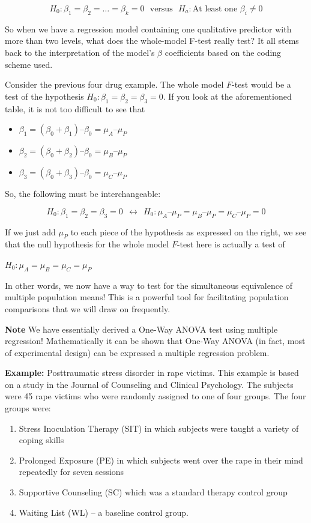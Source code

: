 \documentclass[
]{book}
\providecommand{\tightlist}{%
  \setlength{\itemsep}{0pt}\setlength{\parskip}{0pt}}
\begin{document}
\[H_0: \beta_1 = \beta_2 = \ldots = \beta_k = 0 ~~~\textrm{versus}~~~ H_a: \textrm{At least one } \beta_i \neq 0\]

So when we have a regression model containing one qualitative predictor with more than two levels, what does the whole-model F-test really test? It all stems back to the interpretation of the model's \(\beta\) coefficients based on the coding scheme used.

Consider the previous four drug example. The whole model \(F\)-test would be a test of the hypothesis \(H_0: \beta_1 = \beta_2 = \beta_3 = 0\). If you look at the aforementioned table, it is not too difficult to see that

\begin{itemize}
\tightlist
\item
  \(\beta_1 = (\beta_0 + \beta_1) – \beta_0 = \mu_A – \mu_P\)
\item
  \(\beta_2 = (\beta_0 + \beta_2) – \beta_0 = \mu_B – \mu_P\)
\item
  \(\beta_3 = (\beta_0 + \beta_3) – \beta_0 = \mu_C – \mu_P\)
\end{itemize}

So, the following must be interchangeable:

\[H_0: \beta_1 = \beta_2 = \beta_3 = 0 ~~\longleftrightarrow~~ H_0: \mu_A – \mu_P = \mu_B – \mu_P = \mu_C – \mu_P = 0\]

If we just add \(\mu_P\) to each piece of the hypothesis as expressed on the right, we see that the null hypothesis for the whole model \(F\)-test here is actually a test of

\(H_0: \mu_A = \mu_B = \mu_C = \mu_P\)

In other words, we now have a way to test for the simultaneous equivalence of multiple population means! This is a powerful tool for facilitating population comparisons that we will draw on frequently.

\textbf{Note} We have essentially derived a One-Way ANOVA test using multiple regression! Mathematically it can be shown that One-Way ANOVA (in fact, most of experimental design) can be expressed a multiple regression problem.

\textbf{Example:} Posttraumatic stress disorder in rape victims. This example is based on a study in the Journal of Counseling and Clinical Psychology. The subjects were 45 rape victims who were randomly assigned to one of four groups. The four groups were:

\begin{enumerate}
\def\labelenumi{\arabic{enumi}.}
\tightlist
\item
  Stress Inoculation Therapy (SIT) in which subjects were taught a variety of coping skills
\item
  Prolonged Exposure (PE) in which subjects went over the rape in their mind repeatedly for seven sessions
\item
  Supportive Counseling (SC) which was a standard therapy control group
\item
  Waiting List (WL) -- a baseline control group.
\end{enumerate}
\end{document}
